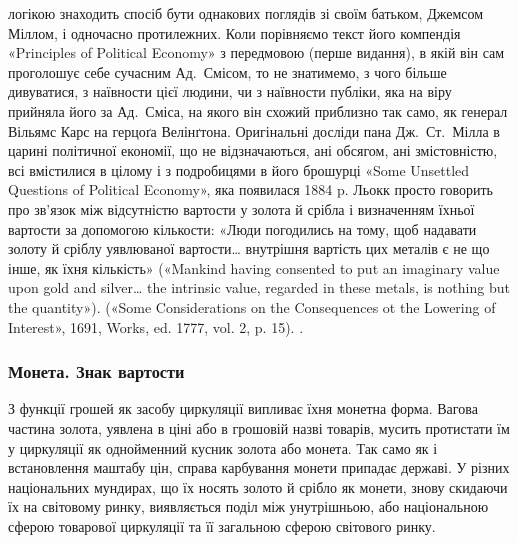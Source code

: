 {логікою знаходить спосіб бути однакових поглядів зі своїм
батьком, Джемсом Міллом, і одночасно протилежних. Коли порівняємо
текст його компендія «Principles of Political Economy» з передмовою
(перше видання), в якій він сам проголошує себе сучасним Ад.~Смісом,
то не знатимемо, з чого більше дивуватися, з наївности цієї людини, чи
з наївности публіки, яка на віру прийняла його за Ад.~Сміса, на якого
він схожий приблизно так само, як генерал Вільямс Карс на герцоґа
Велінґтона. Оригінальні досліди пана Дж.~Ст.~Мілла в царині політичної
економії, що не відзначаються, ані обсягом, ані змістовністю, всі вмістилися
в цілому і з подробицями в його брошурці «Some Unsettled Questions
of Political Economy», яка появилася 1884 p. Льокк просто говорить
про зв’язок між відсутністю вартости у золота й срібла і визначенням
їхньої вартости за допомогою кількости: «Люди погодились на тому, щоб
надавати золоту й сріблу уявлюваної вартости\dots{} внутрішня вартість цих
металів є не що інше, як їхня кількість» («Mankind having consented
to put an imaginary value upon gold and silver\dots{} the intrinsic value, regarded
in these metals, is nothing but the quantity»). («Some Considerations
on the Consequences ot the Lowering of Interest», 1691, Works, ed. 1777,
vol. 2, p. 15).
}.

\subsubsection{Монета. Знак вартости}

З функції грошей як засобу циркуляції випливає їхня монетна
форма. Вагова частина золота, уявлена в ціні або в грошовій
назві товарів, мусить протистати їм у циркуляції як однойменний
кусник золота або монета. Так само як і встановлення маштабу
цін, справа карбування монети припадає державі. У різних національних
мундирах, що їх носять золото й срібло як монети,
знову скидаючи їх на світовому ринку, виявляється поділ між
унутрішньою, або національною сферою товарової циркуляції
та її загальною сферою світового ринку.

